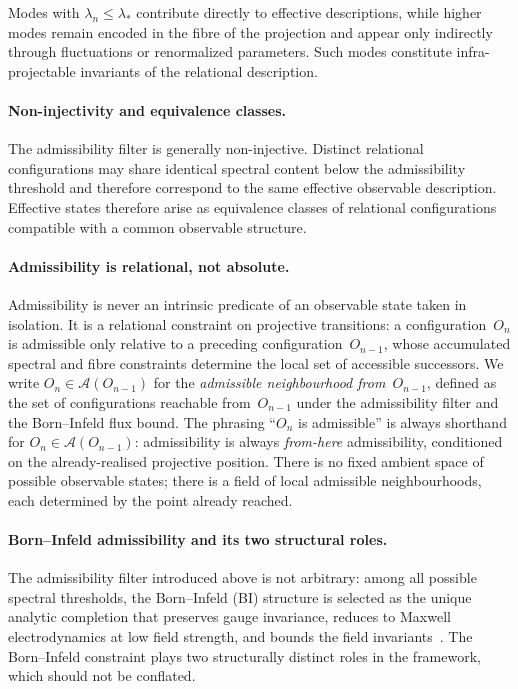     Modes with $\lambda_n \le \lambda_*$ contribute directly to effective
    descriptions, while higher modes remain encoded in the fibre of the
    projection and appear only indirectly through fluctuations or
    renormalized parameters.
    Such modes constitute infra-projectable invariants of the relational
    description.

  \paragraph{Non-injectivity and equivalence classes.}
    The admissibility filter is generally non-injective.
    Distinct relational configurations may share identical spectral
    content below the admissibility threshold and therefore correspond
    to the same effective observable description.
    Effective states therefore arise as equivalence classes of relational
    configurations compatible with a common observable structure.

  \paragraph{Admissibility is relational, not absolute.}
    Admissibility is never an intrinsic predicate of an observable state taken in
    isolation.
    It is a relational constraint on projective transitions: a configuration~$O_n$
    is admissible only relative to a preceding configuration~$O_{n-1}$, whose
    accumulated spectral and fibre constraints determine the local set of
    accessible successors.
    We write $O_n \in \mathcal{A}(O_{n-1})$ for the \emph{admissible neighbourhood
from~$O_{n-1}$}, defined as the set of configurations reachable from~$O_{n-1}$
    under the admissibility filter and the Born--Infeld flux bound.
    The phrasing ``$O_n$ is admissible'' is always shorthand for
    $O_n \in \mathcal{A}(O_{n-1})$: admissibility is always
    \emph{from-here} admissibility, conditioned on the already-realised
    projective position.
    There is no fixed ambient space of possible observable states; there is
    a field of local admissible neighbourhoods, each determined by the point
    already reached.

  \paragraph{Born--Infeld admissibility and its two structural roles.}
    The admissibility filter introduced above is not arbitrary: among all
    possible spectral thresholds, the Born--Infeld (BI) structure is selected
    as the unique analytic completion that preserves gauge invariance, reduces
    to Maxwell electrodynamics at low field strength, and bounds the field
    invariants~\cite{BornInfeld1934,Beau2026a1}.
    The Born--Infeld constraint plays two structurally distinct roles in the
    framework, which should not be conflated.

